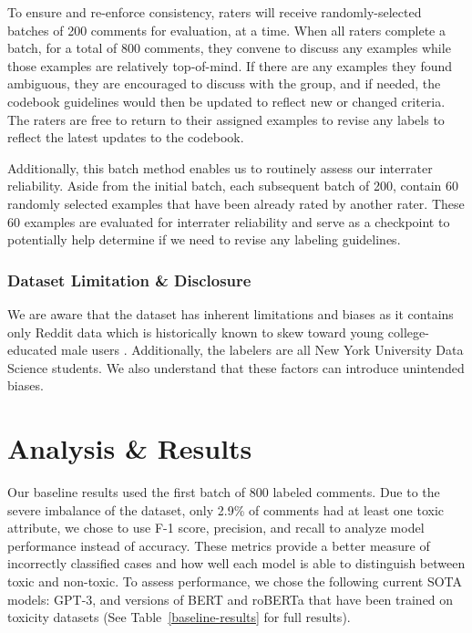 \documentclass[11pt]{article}
\begin{document}
To ensure and re-enforce consistency, raters will receive randomly-selected batches of 200 comments for evaluation, at a time. When all raters complete a batch, for a total of 800 comments, they convene to discuss any examples while those examples are relatively top-of-mind. If there are any examples they found ambiguous, they are encouraged to discuss with the group, and if needed, the codebook guidelines would then be updated to reflect new or changed criteria. The raters are free to return to their assigned examples to revise any labels to reflect the latest updates to the codebook. 

Additionally, this batch method enables us to routinely assess our interrater reliability. Aside from the initial batch, each subsequent batch of 200, contain 60 randomly selected examples that have been already rated by another rater. These 60 examples are evaluated for interrater reliability and serve as a checkpoint to potentially help determine if we need to revise any labeling guidelines.

\subsubsection{Dataset Limitation & Disclosure}

We are aware that the dataset has inherent limitations and biases as it contains only Reddit data which is historically known to skew toward young college-educated male users \citep{auxier2021}. Additionally, the labelers are all New York University Data Science students. We also understand that these factors can introduce unintended biases.


\section{Analysis \& Results}
Our baseline results used the first batch of 800 labeled comments. Due to the severe imbalance of the dataset, only 2.9\% of comments had at least one toxic attribute, we chose to use F-1 score, precision, and recall to analyze model performance instead of accuracy. These metrics provide a better measure of incorrectly classified cases and how well each model is able to distinguish between toxic and non-toxic. To assess performance, we chose the following current SOTA models: GPT-3, and versions of BERT and roBERTa that have been trained on toxicity datasets (See Table~\ref{baseline-results} for full results).
\end{document}
